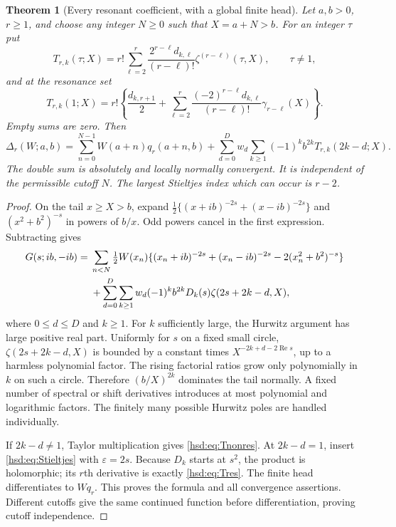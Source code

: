 \documentclass[11pt]{article}
\numberwithin{equation}{section}
\newtheorem{theorem}{Theorem}[section]
\theoremstyle{definition}\newtheorem{definition}[theorem]{Definition}
\theoremstyle{remark}\newtheorem{remark}[theorem]{Remark}
\DeclareMathOperator{\Rea}{Re}
\begin{document}
\begin{theorem}[Every resonant coefficient, with a global finite head]
\label{hsd:thm:stieltjes}
Let $a,b>0$, $r\ge1$, and choose any integer $N\ge0$ such that
$X=a+N>b$. For an integer $\tau$ put
\begin{equation}\label{hsd:eq:Tnonres}
 T_{r,k}(\tau;X)=r!\sum_{\ell=2}^{r}
 \frac{2^{r-\ell}d_{k,\ell}}{(r-\ell)!}
             \zeta^{(r-\ell)}(\tau,X),\qquad \tau\ne1,
\end{equation}
and at the resonance set
\begin{equation}\label{hsd:eq:Tres}
 T_{r,k}(1;X)=r!\left\{\frac{d_{k,r+1}}2+
 \sum_{\ell=2}^{r}\frac{(-2)^{r-\ell}d_{k,\ell}}{(r-\ell)!}
                         \gamma_{r-\ell}(X)\right\}.
\end{equation}
Empty sums are zero. Then
\begin{equation}\label{hsd:eq:Stieltjes-master}
 \boxed{\displaystyle
 \Delta_r(W;a,b)=\sum_{n=0}^{N-1}W(a+n)q_r(a+n,b)
 +\sum_{d=0}^D w_d\sum_{k\ge1}(-1)^kb^{2k}
                         T_{r,k}(2k-d;X).}
\end{equation}
The double sum is absolutely and locally normally convergent. It is
independent of the permissible cutoff $N$. The largest Stieltjes index
which can occur is $r-2$.
\end{theorem}
\begin{proof}
On the tail $x\ge X>b$, expand $\tfrac12\{(x+ib)^{-2s}+
(x-ib)^{-2s}\}$ and $(x^2+b^2)^{-s}$ in powers of $b/x$.
Odd powers cancel in the first expression. Subtracting gives
\begin{align}\label{hsd:eq:Gtail}
 G(s;ib,-ib)={}&\sum_{n<N}\tfrac12 W(x_n)
 \{(x_n+ib)^{-2s}+(x_n-ib)^{-2s}-2(x_n^2+b^2)^{-s}\}\notag\\
 &+\sum_{d=0}^D\sum_{k\ge1} w_d(-1)^kb^{2k}
                         D_k(s)\zeta(2s+2k-d,X),
\end{align}
where $0\le d\le D$ and $k\ge1$.
For $k$ sufficiently large, the Hurwitz argument has large positive
real part. Uniformly for $s$ on a fixed small circle,
$\zeta(2s+2k-d,X)$ is bounded by a constant times
$X^{-2k+d-2\Rea s}$, up to a harmless polynomial factor. The rising
factorial ratios grow only polynomially in $k$ on such a circle.
Therefore $(b/X)^{2k}$ dominates the tail normally. A fixed number of
spectral or shift derivatives introduces at most polynomial and
logarithmic factors. The finitely many possible Hurwitz poles are
handled individually.

If $2k-d\ne1$, Taylor multiplication gives
\eqref{hsd:eq:Tnonres}. At $2k-d=1$, insert
\eqref{hsd:eq:Stieltjes} with $\varepsilon=2s$. Because $D_k$ starts
at $s^2$, the product is holomorphic; its $r$th derivative is exactly
\eqref{hsd:eq:Tres}. The finite head differentiates to $Wq_r$.
This proves the formula and all convergence assertions. Different
cutoffs give the same continued function before differentiation, proving
cutoff independence.
\end{proof}
\end{document}
